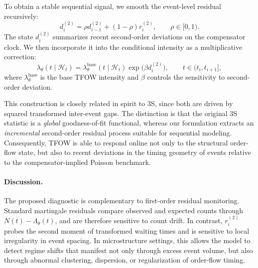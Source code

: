 To obtain a stable sequential signal, we smooth the event-level residual recursively:
\[
d_i^{(2)} = \rho d_{i-1}^{(2)} + (1-\rho) r_i^{(2)},
\qquad \rho \in [0,1).
\]
The state $d_i^{(2)}$ summarizes recent second-order deviations on the compensator clock. We then incorporate it into the conditional intensity as a multiplicative correction:
\[
\lambda_\theta(t \mid \mathcal{H}_t)
=
\lambda_\theta^{\mathrm{base}}(t \mid \mathcal{H}_t)
\exp\!\big(\beta d_i^{(2)}\big),
\qquad t \in (t_i, t_{i+1}],
\]
where $\lambda_\theta^{\mathrm{base}}$ is the base TFOW intensity and $\beta$ controls the sensitivity to second-order deviation.

This construction is closely related in spirit to 3S, since both are driven by squared transformed inter-event gaps. The distinction is that the original 3S statistic is a \emph{global} goodness-of-fit functional, whereas our formulation extracts an \emph{incremental} second-order residual process suitable for sequential modeling. Consequently, TFOW is able to respond online not only to the structural order-flow state, but also to recent deviations in the timing geometry of events relative to the compensator-implied Poisson benchmark.

\paragraph{Discussion.}
The proposed diagnostic is complementary to first-order residual monitoring. Standard martingale residuals compare observed and expected counts through $N(t)-\Lambda_\theta(t)$, and are therefore sensitive to count drift. In contrast, $r_i^{(2)}$ probes the second moment of transformed waiting times and is sensitive to local irregularity in event spacing. In microstructure settings, this allows the model to detect regime shifts that manifest not only through excess event volume, but also through abnormal clustering, dispersion, or regularization of order-flow timing.



